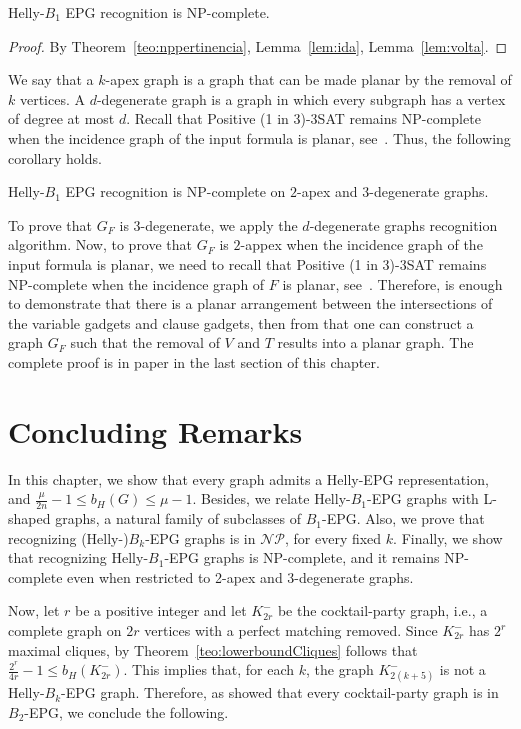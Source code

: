 \begin{theorem}
{\sc Helly-$B_1$ EPG recognition} is NP-complete.
\end{theorem}
\begin{proof} %
By Theorem~\ref{teo:nppertinencia}, Lemma~\ref{lem:ida}, Lemma~\ref{lem:volta}.
 \end{proof}



We say that a $k$-apex graph is a graph that can be made planar by the removal of $k$ vertices. A $d$-degenerate graph is a graph in which every subgraph has a vertex of degree at most $d$. Recall that {\sc Positive (1 in 3)-3SAT} remains NP-complete when the incidence graph of the input formula is planar, see~\cite{mulzer2008minimum}. Thus, the following corollary holds.

\begin{corollary}\label{coro:2apexAnd3degenerate}
{\sc Helly-$B_1$ EPG recognition} is NP-complete on $2$-apex and $3$-degenerate graphs.
\end{corollary}

To prove that $G_F$ is 3-degenerate, we apply the $d$-degenerate graphs recognition algorithm. Now, to prove that $G_F$ is $2$-appex when the incidence graph of the input formula is planar, we need to recall that {\sc Positive (1 in 3)-3SAT} remains NP-complete when the incidence graph of $F$ is planar, see~\cite{mulzer2008minimum}. Therefore, is enough to demonstrate that there is a planar arrangement between the intersections of the variable gadgets and clause gadgets, then from that one can construct a graph $G_F$ such that the removal of $V$ and $T$ results into a planar graph. The complete proof is in paper in the last section of this chapter.


\section{Concluding Remarks}

In this chapter, we show that every graph admits a Helly-EPG representation, and $\frac{\mu}{2n}-1\leq b_H(G)\leq \mu -1$. Besides, we relate Helly-$B_1$-EPG graphs with L-shaped graphs, a natural family of subclasses of $B_1$-EPG. Also, we prove that recognizing (Helly-)$B_k$-EPG graphs is in $\mathcal{NP}$, for every fixed $k$. Finally, we show that recognizing Helly-$B_1$-EPG graphs is NP-complete, and it remains NP-complete even when restricted to 2-apex and 3-degenerate graphs.

Now, let $r$ be a positive integer and let $K_{2r}^-$ be the cocktail-party graph, i.e., a complete graph on $2r$ vertices with a perfect matching removed. Since $K_{2r}^-$ has $2^r$ maximal cliques, by Theorem~\ref{teo:lowerboundCliques} follows that $\frac{2^r}{4r}-1\leq b_H(K_{2r}^-)$. This implies that, for each $k$, the graph $K_{2(k+5)}^-$ is not a Helly-$B_k$-EPG graph. Therefore, as \cite{martin2017} showed that every cocktail-party graph is in $B_2$-EPG, we conclude the following.

